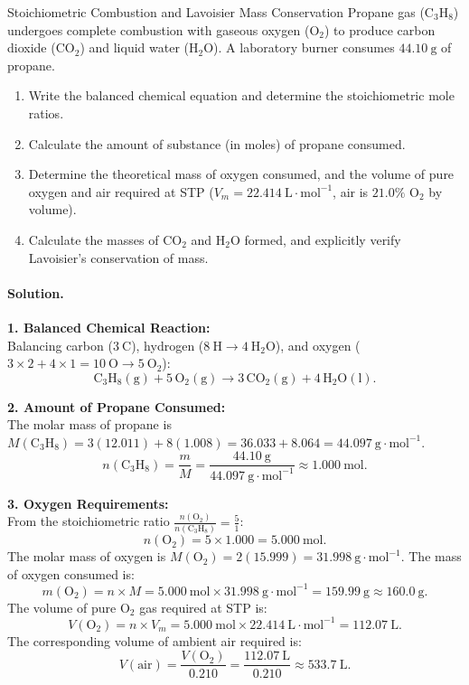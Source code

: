 \begin{workedexample}{Stoichiometric Combustion and Lavoisier Mass Conservation}
Propane gas ($\mathrm{C_3H_8}$) undergoes complete combustion with gaseous oxygen ($\mathrm{O_2}$) to produce carbon dioxide ($\mathrm{CO_2}$) and liquid water ($\mathrm{H_2O}$). A laboratory burner consumes $44.10\ \mathrm{g}$ of propane.
\begin{enumerate}[leftmargin=1.4em,itemsep=3pt]
  \item Write the balanced chemical equation and determine the stoichiometric mole ratios.
  \item Calculate the amount of substance (in moles) of propane consumed.
  \item Determine the theoretical mass of oxygen consumed, and the volume of pure oxygen and air required at STP ($V_m = 22.414\ \mathrm{L\cdot mol^{-1}}$, air is $21.0\%$ $\mathrm{O_2}$ by volume).
  \item Calculate the masses of $\mathrm{CO_2}$ and $\mathrm{H_2O}$ formed, and explicitly verify Lavoisier's conservation of mass.
\end{enumerate}

\paragraph{Solution.}
\textbf{1. Balanced Chemical Reaction:}\\
Balancing carbon ($3\ \mathrm{C}$), hydrogen ($8\ \mathrm{H} \to 4\ \mathrm{H_2O}$), and oxygen ($3 \times 2 + 4 \times 1 = 10\ \mathrm{O} \to 5\ \mathrm{O_2}$):
\[
\mathrm{C_3H_8(g)} + 5\,\mathrm{O_2(g)} \longrightarrow 3\,\mathrm{CO_2(g)} + 4\,\mathrm{H_2O(l)}.
\]

\textbf{2. Amount of Propane Consumed:}\\
The molar mass of propane is $M(\mathrm{C_3H_8}) = 3(12.011) + 8(1.008) = 36.033 + 8.064 = 44.097\ \mathrm{g\cdot mol^{-1}}$.
\[
n(\mathrm{C_3H_8}) = \frac{m}{M} = \frac{44.10\ \mathrm{g}}{44.097\ \mathrm{g\cdot mol^{-1}}} \approx 1.000\ \mathrm{mol}.
\]

\textbf{3. Oxygen Requirements:}\\
From the stoichiometric ratio $\frac{n(\mathrm{O_2})}{n(\mathrm{C_3H_8})} = \frac{5}{1}$:
\[
n(\mathrm{O_2}) = 5 \times 1.000 = 5.000\ \mathrm{mol}.
\]
The molar mass of oxygen is $M(\mathrm{O_2}) = 2(15.999) = 31.998\ \mathrm{g\cdot mol^{-1}}$.
The mass of oxygen consumed is:
\[
m(\mathrm{O_2}) = n \times M = 5.000\ \mathrm{mol} \times 31.998\ \mathrm{g\cdot mol^{-1}} = 159.99\ \mathrm{g} \approx 160.0\ \mathrm{g}.
\]
The volume of pure $\mathrm{O_2}$ gas required at STP is:
\[
V(\mathrm{O_2}) = n \times V_m = 5.000\ \mathrm{mol} \times 22.414\ \mathrm{L\cdot mol^{-1}} = 112.07\ \mathrm{L}.
\]
The corresponding volume of ambient air required is:
\[
V(\text{air}) = \frac{V(\mathrm{O_2})}{0.210} = \frac{112.07\ \mathrm{L}}{0.210} \approx 533.7\ \mathrm{L}.
\]


\end{workedexample}
